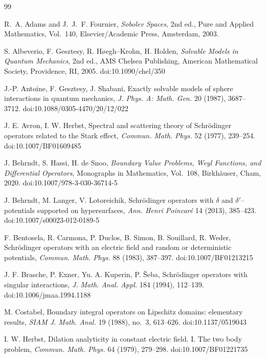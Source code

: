 \documentclass[a4paper,11pt]{article}
\numberwithin{equation}{section}
\theoremstyle{remark}
\theoremstyle{definition}
\theoremstyle{remark}
\begin{document}
\begin{thebibliography}{99}

R.~A. Adams and J.~J.~F. Fournier,
\textit{Sobolev Spaces}, 2nd ed.,
Pure and Applied Mathematics, Vol.~140,
Elsevier/Academic Press, Amsterdam, 2003.

S. Albeverio, F. Gesztesy, R. H{\o}egh--Krohn, H. Holden,
\textit{Solvable Models in Quantum Mechanics},
2nd ed., AMS Chelsea Publishing, American Mathematical Society,
Providence, RI, 2005.
doi:10.1090/chel/350

J.-P. Antoine, F. Gesztesy, J. Shabani,
Exactly solvable models of sphere interactions in quantum mechanics,
\textit{J. Phys. A: Math. Gen.} 20 (1987), 3687--3712.
doi:10.1088/0305-4470/20/12/022

J. E. Avron, I. W. Herbst,
Spectral and scattering theory of Schr\"odinger operators related to the
Stark effect,
\textit{Commun. Math. Phys.} 52 (1977), 239--254.
doi:10.1007/BF01609485

J. Behrndt, S. Hassi, H. de Snoo,
\textit{Boundary Value Problems, Weyl Functions, and Differential Operators},
Monographs in Mathematics, Vol.~108,
Birkh\"auser, Cham, 2020.
doi:10.1007/978-3-030-36714-5

J. Behrndt, M. Langer, V. Lotoreichik,
Schr\"odinger operators with $\delta$ and $\delta'$--potentials supported on
hypersurfaces,
\textit{Ann. Henri Poincar\'e} 14 (2013), 385--423.
doi:10.1007/s00023-012-0189-5

F. Bentosela, R. Carmona, P. Duclos, B. Simon, B. Souillard, R. Weder,
Schr\"odinger operators with an electric field and random or deterministic
potentials,
\textit{Commun. Math. Phys.} 88 (1983), 387--397.
doi:10.1007/BF01213215

J. F. Brasche, P. Exner, Yu. A. Kuperin, P. \v{S}eba,
Schr\"odinger operators with singular interactions,
\textit{J. Math. Anal. Appl.} 184 (1994), 112--139.
doi:10.1006/jmaa.1994.1188

M. Costabel,
Boundary integral operators on Lipschitz domains: elementary results,
\textit{SIAM J. Math. Anal.} 19 (1988), no.~3, 613--626.
doi:10.1137/0519043

I. W. Herbst,
Dilation analyticity in constant electric field. I. The two body problem,
\textit{Commun. Math. Phys.} 64 (1979), 279--298.
doi:10.1007/BF01221735


\end{thebibliography}
\end{document}
